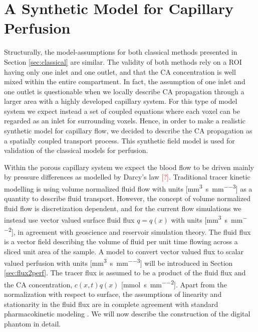 \documentclass[paper=a4, fontsize=11pt,parskip=half,headings=small]{scrartcl}
\newcommand{\siQmm}{\milli\meter\cubed\per\second\per\milli\meter\cubed}
\newcommand{\siq}{\milli\meter\cubed\per\second\per\milli\meter\squared}
\newcommand{\siJ}{\milli\mol\per\second\per\milli\meter\squared}
\newcommand{\siphi}{\milli\meter\cubed\per\milli\meter\cubed}
\newcommand{\missingsource}{\textcolor{red}{[?]}}
\begin{document}
	
	
	\section{A Synthetic Model for Capillary Perfusion}\label{sec:synthetic}
	
	Structurally, the model-assumptions for both classical methods presented in Section \ref{sec:classical} are similar.
	The validity of both methods rely on a ROI having only one inlet and one outlet, and that the CA concentration is well mixed within the entire compartment.
	In fact, the assumption of one inlet and one outlet is questionable when we locally describe CA propagation through a larger area with a highly developed capillary system.
	For this type of model system we expect instead a set of coupled equations where each voxel can be regarded as an inlet for surrounding voxels.
	Hence, in order to make a realistic synthetic model for capillary flow, we decided to describe the CA propagation as a spatially coupled transport process. This synthetic field model is used for validation of the classical models for perfusion. 

	
	Within the porous capillary system we expect the blood flow to be driven mainly by pressure differences as modelled by Darcy's law \missingsource. Traditional tracer kinetic modelling is using volume normalized fluid flow with units [\si{\siQmm}] as a quantity to describe fluid transport. 
	However, the concept of volume normalized fluid flow is discretization dependent, and for the current flow simulations we instead use vector valued surface fluid flux $q = q(x)$ with units [\si{\siq}], in agreement with geoscience and reservoir simulation theory.
	The fluid flux is a vector field describing the volume of fluid per unit time flowing across a sliced unit area of the sample.	
	A model to convert vector valued flux to scalar valued perfusion with units [\si{\siQmm}] will be introduced in Section \ref{sec:flux2perf}.
	The tracer flux is assumed to be a product of the fluid flux and the CA concentration, $c(x,t)q(x)$ [\si{\siJ}].
	Apart from the normalization with respect to surface, the assumptions of linearity and stationarity in the fluid flux are in complete agreement with standard pharmacokinetic modeling \cite{sourbron13}.
	We will now describe the construction of the digital phantom in detail.	
	
\end{document}
